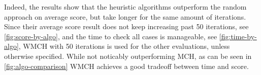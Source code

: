 Indeed, the results show that the heuristic algorithms outperform the random approach on average score, but take longer for the same amount of iterations. Since their average score result does not keep increasing past 50 iterations, see \ref{fig:score-by-algo}, and the time to check all cases is manageable, see \ref{fig:time-by-algo}, \ac{WMCH} with 50 iterations is used for the other evaluations, unless otherwise specified.
While not noticably outperforming \ac{MCH}, as can be seen in \ref{fig:algo-comparison} \ac{WMCH} achieves a good tradeoff between time and score.


